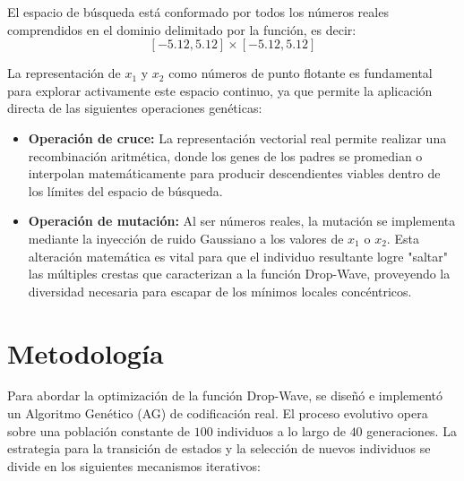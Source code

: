 El espacio de búsqueda está conformado por todos los números reales comprendidos en el dominio delimitado por la función, es decir:
$$[-5.12, 5.12] \times [-5.12, 5.12]$$

La representación de $x_{1}$ y $x_{2}$ como números de punto flotante es fundamental para explorar activamente este espacio continuo, ya que permite la aplicación
directa de las siguientes operaciones genéticas:

\begin{itemize}
    \item \textbf{Operación de cruce:} La representación vectorial real permite realizar una recombinación aritmética, donde los genes de los padres se promedian o
        interpolan matemáticamente para producir descendientes viables dentro de los límites del espacio de búsqueda.

    \item \textbf{Operación de mutación:} Al ser números reales, la mutación se implementa mediante la inyección de ruido Gaussiano a los valores de $x_{1}$ o $x_{2}$.
        Esta alteración matemática es vital para que el individuo resultante logre "saltar" las múltiples crestas que caracterizan a la función Drop-Wave, proveyendo la
        diversidad necesaria para escapar de los mínimos locales concéntricos.
\end{itemize}


\clearpage
\section{Metodología}

Para abordar la optimización de la función Drop-Wave, se diseñó e implementó un Algoritmo Genético (AG) de codificación real. El proceso evolutivo opera sobre una
población constante de $100$ individuos a lo largo de $40$ generaciones. La estrategia para la transición de estados y la selección de nuevos individuos se divide
en los siguientes mecanismos iterativos:


